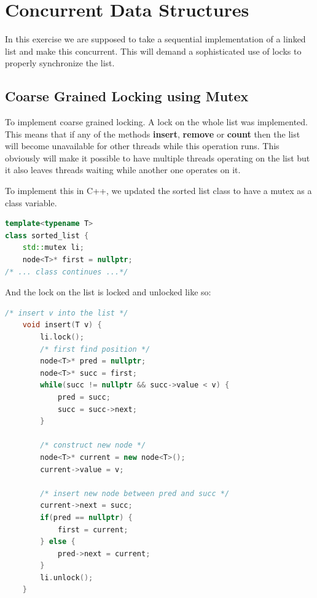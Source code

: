 \section{Concurrent Data Structures}

In this exercise we are supposed to take a sequential implementation of a 
linked list and make this concurrent. This will demand a sophisticated use of
locks to properly synchronize the list.

\subsection{Coarse Grained Locking using Mutex}

To implement coarse grained locking. A lock on the whole list was implemented.
This means that if any of the methods \textbf{insert}, \textbf{remove} or 
\textbf{count} then the list will become unavailable for other threads while 
this operation runs. This obviously will make it possible to have multiple 
threads operating on the list but it also leaves threads waiting while another 
one operates on it.

To implement this in C++, we updated the sorted list class to have a mutex as a
class variable.

\begin{lstlisting}[language=C++]
template<typename T>
class sorted_list {
	std::mutex li;
	node<T>* first = nullptr;
/* ... class continues ...*/
\end{lstlisting}

And the lock on the list is locked and unlocked like so:

\begin{lstlisting}[language=C++, caption=Coarse-Grained Insert]
    /* insert v into the list */
    void insert(T v) {
        li.lock();
        /* first find position */
        node<T>* pred = nullptr;
        node<T>* succ = first;
        while(succ != nullptr && succ->value < v) {
            pred = succ;
            succ = succ->next;
        }
        
        /* construct new node */
        node<T>* current = new node<T>();
        current->value = v;
    
        /* insert new node between pred and succ */
        current->next = succ;
        if(pred == nullptr) {
            first = current;
        } else {
            pred->next = current;
        }
        li.unlock();
    }
\end{lstlisting}


